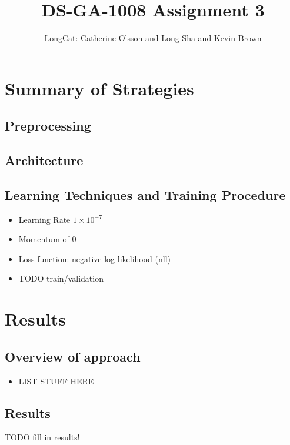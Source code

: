 \documentclass{article}
\title{DS-GA-1008 Assignment 3}
\author{LongCat: Catherine Olsson and Long Sha and Kevin Brown}
\begin{document}
 \maketitle

\section*{Summary of Strategies}

\subsection*{Preprocessing}


\subsection*{Architecture}


\subsection*{Learning Techniques and Training Procedure}

\begin{itemize}
\item Learning Rate $1 \times 10^{-7}$
\item Momentum of $0$
\item Loss function: negative log likelihood (nll)
\item TODO train/validation
\end{itemize}

\section*{Results}

\subsection*{Overview of approach}

\begin{itemize}
\item LIST STUFF HERE
\end{itemize}

\subsection*{Results}

TODO fill in results!
\end{document}
